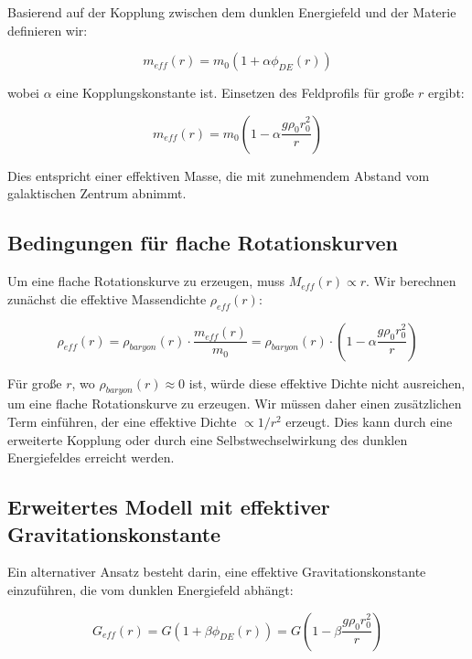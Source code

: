 \documentclass[a4paper,12pt]{article}
\begin{document}
	Basierend auf der Kopplung zwischen dem dunklen Energiefeld und der Materie definieren wir:
	
	\begin{equation}
		m_{eff}(r) = m_0(1 + \alpha\phi_{DE}(r))
	\end{equation}
	
	wobei $\alpha$ eine Kopplungskonstante ist. Einsetzen des Feldprofils für große $r$ ergibt:
	
	\begin{equation}
		m_{eff}(r) = m_0\left(1 - \alpha\frac{g\rho_0 r_0^2}{r}\right)
	\end{equation}
	
	Dies entspricht einer effektiven Masse, die mit zunehmendem Abstand vom galaktischen Zentrum abnimmt.
	
	\subsection{Bedingungen für flache Rotationskurven}
	
	Um eine flache Rotationskurve zu erzeugen, muss $M_{eff}(r) \propto r$. Wir berechnen zunächst die effektive Massendichte $\rho_{eff}(r)$:
	
	\begin{equation}
		\rho_{eff}(r) = \rho_{baryon}(r) \cdot \frac{m_{eff}(r)}{m_0} = \rho_{baryon}(r) \cdot \left(1 - \alpha\frac{g\rho_0 r_0^2}{r}\right)
	\end{equation}
	
	Für große $r$, wo $\rho_{baryon}(r) \approx 0$ ist, würde diese effektive Dichte nicht ausreichen, um eine flache Rotationskurve zu erzeugen. Wir müssen daher einen zusätzlichen Term einführen, der eine effektive Dichte $\propto 1/r^2$ erzeugt. Dies kann durch eine erweiterte Kopplung oder durch eine Selbstwechselwirkung des dunklen Energiefeldes erreicht werden.
	
	\subsection{Erweitertes Modell mit effektiver Gravitationskonstante}
	
	Ein alternativer Ansatz besteht darin, eine effektive Gravitationskonstante einzuführen, die vom dunklen Energiefeld abhängt:
	
	\begin{equation}
		G_{eff}(r) = G\left(1 + \beta\phi_{DE}(r)\right) = G\left(1 - \beta\frac{g\rho_0 r_0^2}{r}\right)
	\end{equation}
	
\end{document}
